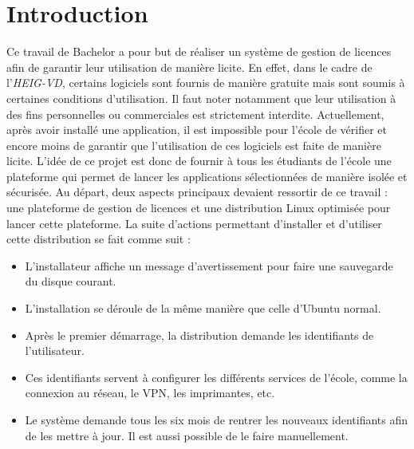 \chapter{Introduction}
\label{ch:intro}

Ce travail de Bachelor a pour but de réaliser un système de gestion de licences afin de garantir leur utilisation de manière licite.
En effet, dans le cadre de l'\textit{HEIG-VD}, certains logiciels sont fournis de manière gratuite mais sont soumis à certaines conditions d'utilisation.
Il faut noter notamment que leur utilisation à des fins personnelles ou commerciales est strictement interdite.
Actuellement, après avoir installé une application, il est impossible pour l'école de vérifier et encore moins de garantir que l'utilisation de ces logiciels est faite de manière licite.
L'idée de ce projet est donc de fournir à tous les étudiants de l'école une plateforme qui permet de lancer les applications sélectionnées de manière isolée et sécurisée.
Au départ, deux aspects principaux devaient ressortir de ce travail : une plateforme de gestion de licences et une distribution Linux optimisée pour lancer cette plateforme.
La suite d'actions permettant d'installer et d'utiliser cette distribution se fait comme suit :
\begin{itemize}
    \item L'installateur affiche un message d'avertissement pour faire une sauvegarde du disque courant.
    \item L'installation se déroule de la même manière que celle d'Ubuntu normal.
    \item Après le premier démarrage, la distribution demande les identifiants de l'utilisateur.
    \item Ces identifiants servent à configurer les différents services de l'école, comme la connexion au réseau, le VPN, les imprimantes, etc.
    \item Le système demande tous les six mois de rentrer les nouveaux identifiants afin de les mettre à jour. Il est aussi possible de le faire manuellement.
\end{itemize}

